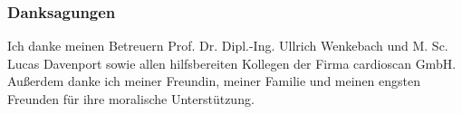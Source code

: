 \subsubsection*{Danksagungen}%

Ich danke meinen Betreuern Prof. Dr. Dipl.-Ing. Ullrich Wenkebach und M. Sc. Lucas Davenport sowie allen hilfsbereiten Kollegen der Firma cardioscan GmbH. Außerdem danke ich meiner Freundin, meiner Familie und meinen engsten Freunden für ihre moralische Unterstützung.


\endinput
